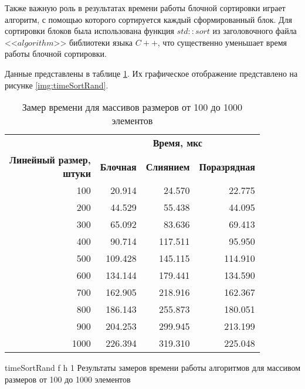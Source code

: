Также важную роль в результатах времени работы блочной сортировки играет алгоритм, с помощью которого сортируется каждый сформированный блок. Для сортировки блоков была использована функция $std::sort$ из заголовочного файла <<$algorithm$>> библиотеки языка $C++$, что существенно уменьшает время работы блочной сортировки.

Данные представлены в таблице \ref{tbl:timeRand}. Их графическое отображение представлено на рисунке \ref{img:timeSortRand}.

\begin{table}[ht]
	\small
	\begin{center}
		\begin{threeparttable}
			\caption{Замер времени для массивов размеров от 100 до 1000 элементов}
			\label{tbl:timeRand}
			\begin{tabular}{|r|r|r|r|}
				\hline
				& \multicolumn{3}{c|}{\bfseries Время, мкс} \\ \cline{2-4}
				\bfseries \makecell{Линейный размер, \\ штуки} & \bfseries Блочная & \bfseries Слиянием & \bfseries Поразрядная \\ \cline{2-4}
				\hline
				100 & 20.914 & 24.570 & 22.775 \\
				\hline
				200 & 44.529 & 55.438 & 44.095 \\
				\hline
				300 & 65.092 & 83.636 & 69.413 \\
				\hline
				400 & 90.714 & 117.511 & 95.950 \\
				\hline
				500 & 109.428 & 145.115 & 114.910 \\
				\hline
				600 & 134.144 & 179.441 & 134.590 \\
				\hline
				700 & 162.905 & 218.916 & 162.367 \\
				\hline
				800 & 186.143 & 255.873 & 180.051 \\
				\hline
				900 & 204.253 & 299.945 & 213.199 \\
				\hline
				1000 & 226.394 & 319.310 & 225.048 \\
				\hline
			\end{tabular}	
		\end{threeparttable}
	\end{center}
\end{table}

\clearpage

{timeSortRand} %
{f} %
{h} %
{1\textwidth} %
{Результаты замеров времени работы алгоритмов для массивом размеров от 100 до 1000 элементов} %

